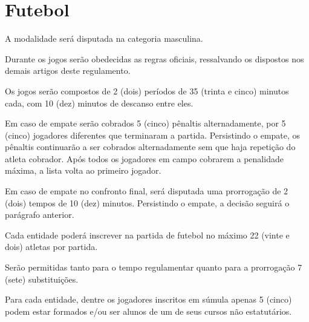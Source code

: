 {\let\clearpage\relax \chapter{Futebol}}

\begin{article}
	A modalidade será disputada na categoria masculina.
\end{article}

\begin{article}
	Durante os jogos serão obedecidas as regras oficiais, ressalvando os dispostos nos demais artigos deste regulamento.
\end{article}

\begin{article}
	Os jogos serão compostos de 2 (dois) períodos de 35 (trinta e cinco) minutos cada, com 10 (dez) minutos de descanso entre eles.

	\begin{xparagraph}
		Em caso de empate serão cobrados 5 (cinco) pênaltis alternadamente, por 5 (cinco) jogadores diferentes que terminaram a partida. Persistindo o empate, os pênaltis continuarão a ser cobrados alternadamente sem que haja repetição do atleta cobrador. Após todos os jogadores em campo cobrarem a penalidade máxima, a lista volta ao primeiro jogador.
	\end{xparagraph}

	\begin{xparagraph}
		Em caso de empate no confronto final, será disputada uma prorrogação de 2 (dois) tempos de 10 (dez) minutos. Persistindo o empate, a decisão seguirá o parágrafo anterior.
	\end{xparagraph}
\end{article}

\begin{article}
	Cada entidade poderá inscrever na partida de futebol no máximo 22 (vinte e dois) atletas por partida.
\end{article}

\begin{article}
	Serão permitidas tanto para o tempo regulamentar quanto para a prorrogação 7 (sete) substituições.
\end{article}

\begin{article}
	Para cada entidade, dentre os jogadores inscritos em súmula apenas 5 (cinco) podem estar formados e/ou ser alunos de um de seus cursos não estatutários.
\end{article}
